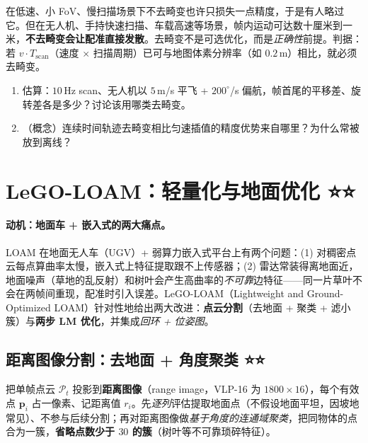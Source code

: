 \begin{pitfall}
在低速、小 FoV、慢扫描场景下不去畸变也许只损失一点精度，于是有人略过它。但在无人机、手持快速扫描、车载高速等场景，帧内运动可达数十厘米到一米，\textbf{不去畸变会让配准直接发散}。去畸变不是可选优化，而是\emph{正确性}前提。判据：若 $v\cdot T_{\text{scan}}$（速度 $\times$ 扫描周期）已可与地图体素分辨率（如 $0.2$\,m）相比，就必须去畸变。
\end{pitfall}

\begin{practice}
\begin{enumerate}
  \item 估算：$10$\,Hz scan、无人机以 $5$\,m/s 平飞 + $200^\circ$/s 偏航，帧首尾的平移差、旋转差各是多少？讨论该用哪类去畸变。
  \item （概念）连续时间轨迹去畸变相比匀速插值的精度优势来自哪里？为什么常被放到离线？
\end{enumerate}
\end{practice}

\section{LeGO-LOAM：轻量化与地面优化 ⭐⭐}
\label{sec:lidar-lego}

\paragraph{动机：地面车 + 嵌入式的两大痛点。}
LOAM 在地面无人车（UGV）+ 弱算力嵌入式平台上有两个问题\cite{shan2018legoloam}：(1) 对稠密点云每点算曲率太慢，嵌入式上特征提取跟不上传感器；(2) 雷达常装得离地面近，地面噪声（草地的乱反射）和树叶会产生高曲率的\emph{不可靠}边特征——同一片草叶不会在两帧间重现，配准时引入误差。LeGO-LOAM（Lightweight and Ground-Optimized LOAM）针对性地给出两大改进：\textbf{点云分割}（去地面 + 聚类 + 滤小簇）与\textbf{两步 LM 优化}，并集成\emph{回环 + 位姿图}。

\subsection{距离图像分割：去地面 + 角度聚类 ⭐⭐}
\label{sec:lidar-lego-seg}

把单帧点云 $\mathcal{P}_t$ 投影到\textbf{距离图像}（range image，VLP-16 为 $1800\times16$），每个有效点 $\mathbf{p}_i$ 占一像素、记距离值 $r_i$\cite{shan2018legoloam}。先\emph{逐列}评估提取地面点（不假设地面平坦，因坡地常见）、不参与后续分割；再对距离图像做\emph{基于角度的连通域聚类}\cite{bogoslavskyi2016fast}，把同物体的点合为一簇，\textbf{省略点数少于 $30$ 的簇}（树叶等不可靠琐碎特征）。

